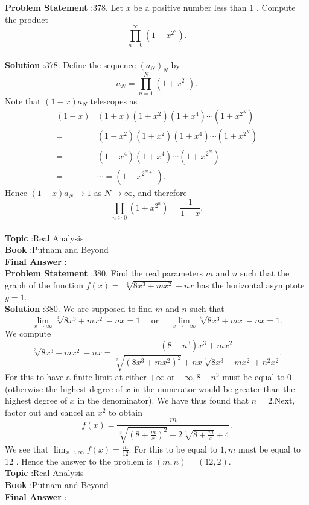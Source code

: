 \documentclass[10pt]{article}
\begin{document}
\textbf{Problem Statement} :378. Let $x$ be a positive number less than 1 . Compute the product$$ \prod_{n=0}^{\infty}\left(1+x^{2^{n}}\right) . $$\\
\textbf{Solution} :378. Define the sequence $\left(a_{N}\right)_{N}$ by$$ a_{N}=\prod_{n=1}^{N}\left(1+x^{2^{n}}\right) . $$Note that $(1-x) a_{N}$ telescopes as$$ \begin{aligned} (1-x) &(1+x)\left(1+x^{2}\right)\left(1+x^{4}\right) \cdots\left(1+x^{2^{N}}\right) \\ =&\left(1-x^{2}\right)\left(1+x^{2}\right)\left(1+x^{4}\right) \cdots\left(1+x^{2^{N}}\right) \\ =&\left(1-x^{4}\right)\left(1+x^{4}\right) \cdots\left(1+x^{2^{N}}\right) \\ =& \cdots=\left(1-x^{2^{N+1}}\right) . \end{aligned} $$Hence $(1-x) a_{N} \rightarrow 1$ as $N \rightarrow \infty$, and therefore$$ \prod_{n \geq 0}\left(1+x^{2^{n}}\right)=\frac{1}{1-x} . $$\\
\textbf{Topic} :Real Analysis\\
\textbf{Book} :Putnam and Beyond\\
\textbf{Final Answer} :\\


\textbf{Problem Statement} :380. Find the real parameters $m$ and $n$ such that the graph of the function $f(x)=$ $\sqrt[3]{8 x^{3}+m x^{2}}-n x$ has the horizontal asymptote $y=1$. \\
\textbf{Solution} :380. We are supposed to find $m$ and $n$ such that$$ \lim _{x \rightarrow \infty} \sqrt[3]{8 x^{3}+m x^{2}}-n x=1 \quad \text { or } \quad \lim _{x \rightarrow-\infty} \sqrt[3]{8 x^{3}+m x}-n x=1 . $$We compute$$ \sqrt[3]{8 x^{3}+m x^{2}}-n x=\frac{\left(8-n^{3}\right) x^{3}+m x^{2}}{\sqrt[3]{\left(8 x^{3}+m x^{2}\right)^{2}}+n x \sqrt[3]{8 x^{3}+m x^{2}}+n^{2} x^{2}} . $$For this to have a finite limit at either $+\infty$ or $-\infty, 8-n^{3}$ must be equal to 0 (otherwise the highest degree of $x$ in the numerator would be greater than the highest degree of $x$ in the denominator). We have thus found that $n=2$.Next, factor out and cancel an $x^{2}$ to obtain$$ f(x)=\frac{m}{\sqrt[3]{\left(8+\frac{m}{x}\right)^{2}}+2 \sqrt[3]{8+\frac{m}{x}}+4} . $$We see that $\lim _{x \rightarrow \infty} f(x)=\frac{m}{12}$. For this to be equal to $1, m$ must be equal to 12 . Hence the answer to the problem is $(m, n)=(12,2)$.\\
\textbf{Topic} :Real Analysis\\
\textbf{Book} :Putnam and Beyond\\
\textbf{Final Answer} :\\
\end{document}
